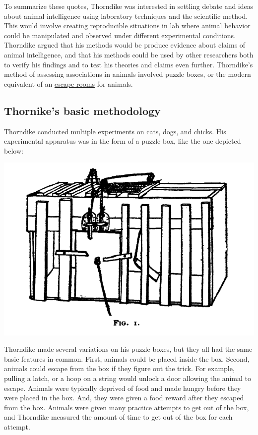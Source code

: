 \documentclass[
  oneside,
  12pt]{crumpbook}
\newenvironment{floatright50}{%
  \wrapfigure{R}{.5\textwidth}%
  }{%
  \endwrapfigure}
\begin{document}
To summarize these quotes, Thorndike was interested in settling debate and ideas about animal intelligence using laboratory techniques and the scientific method. This would involve creating reproducible situations in lab where animal behavior could be manipulated and observed under different experimental conditions. Thorndike argued that his methods would be produce evidence about claims of animal intelligence, and that his methods could be used by other researchers both to verify his findings and to test his theories and claims even further. Thorndike's method of assessing associations in animals involved puzzle boxes, or the modern equivalent of an \href{https://en.wikipedia.org/wiki/Escape_room}{escape rooms} for animals.

\hypertarget{thornikes-basic-methodology}{%
\subsection{Thornike's basic methodology}\label{thornikes-basic-methodology}}

Thorndike conducted multiple experiments on cats, dogs, and chicks. His experimental apparatus was in the form of a puzzle box, like the one depicted below:

\begin{floatright50}
\includegraphics[width=1\linewidth]{imgs/Thorndike_puzzle_box_1898}

\end{floatright50}

Thorndike made several variations on his puzzle boxes, but they all had the same basic features in common. First, animals could be placed inside the box. Second, animals could escape from the box if they figure out the trick. For example, pulling a latch, or a hoop on a string would unlock a door allowing the animal to escape. Animals were typically deprived of food and made hungry before they were placed in the box. And, they were given a food reward after they escaped from the box. Animals were given many practice attempts to get out of the box, and Thorndike measured the amount of time to get out of the box for each attempt.
\end{document}
